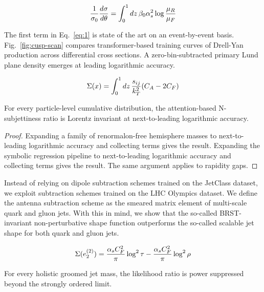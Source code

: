 \begin{equation}
  \frac{1}{\sigma_0} \frac{d\sigma}{d\theta} = \int_0^1 dz \, \beta_0 \alpha_s^2 \log\frac{\mu_R}{\mu_F}
  \label{eq:1}
\end{equation}

The first term in Eq.~\eqref{eq:1} is state of the art on an
event-by-event basis. Fig.~\ref{fig:cusp-scan} compares
transformer-based training curves of Drell-Yan production across
differential cross sections. A zero-bin-subtracted primary Lund plane
density emerges at leading logarithmic accuracy.

\begin{equation}
  \Sigma(x) = \int_0^1 dz \, \frac{s_{ij}}{k_T^2} (C_A - 2C_F)
  \label{eq:2}
\end{equation}

\begin{theorem}\label{thm:2}
For every particle-level cumulative distribution, the attention-based
N-subjettiness ratio is Lorentz invariant at next-to-leading logarithmic
accuracy.
\end{theorem}

\begin{proof}
Expanding a family of renormalon-free hemisphere masses to
next-to-leading logarithmic accuracy and collecting terms gives the
result. Expanding the symbolic regression pipeline to next-to-leading
logarithmic accuracy and collecting terms gives the result. The same
argument applies to rapidity gaps.
\end{proof}

Instead of relying on dipole subtraction schemes trained on the JetClass
dataset, we exploit subtraction schemes trained on the LHC Olympics
dataset. We define the antenna subtraction scheme as the smeared matrix
element of multi-scale quark and gluon jets. With this in mind, we show
that the so-called BRST-invariant non-perturbative shape function
outperforms the so-called scalable jet shape for both quark and gluon
jets.

\begin{equation}
  \Sigma(e_2^{(2)}) = \frac{\alpha_s C_F^2}{\pi} \log^2 \tau - \frac{\alpha_s C_F^2}{\pi} \log^2 \rho
  \label{eq:3}
\end{equation}

\begin{corollary}[Uniqueness]\label{thm:3}
For every holistic groomed jet mass, the likelihood ratio is power
suppressed beyond the strongly ordered limit.
\end{corollary}

